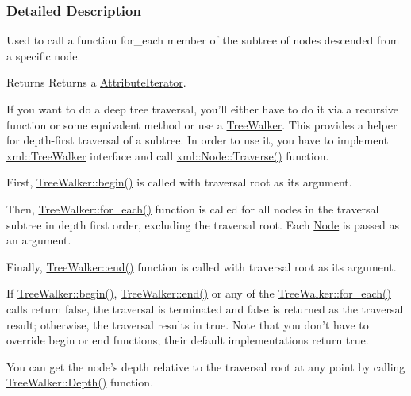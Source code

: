 \subsubsection{Detailed Description}
Used to call a function for\_\-each member of the subtree of nodes descended from a specific node. \begin{DoxyReturn}{Returns}
Returns a \hyperlink{classphys_1_1xml_1_1AttributeIterator}{AttributeIterator}.
\end{DoxyReturn}
If you want to do a deep tree traversal, you'll either have to do it via a recursive function or some equivalent method or use a \hyperlink{classphys_1_1xml_1_1TreeWalker}{TreeWalker}. This provides a helper for depth-\/first traversal of a subtree. In order to use it, you have to implement \hyperlink{classphys_1_1xml_1_1TreeWalker}{xml::TreeWalker} interface and call \hyperlink{classphys_1_1xml_1_1Node_a0029d08d3689c36d882ada0c0c9cf6e9}{xml::Node::Traverse()} function. \par
\par
 First, \hyperlink{classphys_1_1xml_1_1TreeWalker_a649d9e5a06542be0282d3d20994a62fc}{TreeWalker::begin()} is called with traversal root as its argument.\par
 Then, \hyperlink{classphys_1_1xml_1_1TreeWalker_a03267e73acac44809f16739fd00a536d}{TreeWalker::for\_\-each()} function is called for all nodes in the traversal subtree in depth first order, excluding the traversal root. Each \hyperlink{classphys_1_1xml_1_1Node}{Node} is passed as an argument.\par
 Finally, \hyperlink{classphys_1_1xml_1_1TreeWalker_a210f6d60579a152f89e651be797885b9}{TreeWalker::end()} function is called with traversal root as its argument.\par
\par
 If \hyperlink{classphys_1_1xml_1_1TreeWalker_a649d9e5a06542be0282d3d20994a62fc}{TreeWalker::begin()}, \hyperlink{classphys_1_1xml_1_1TreeWalker_a210f6d60579a152f89e651be797885b9}{TreeWalker::end()} or any of the \hyperlink{classphys_1_1xml_1_1TreeWalker_a03267e73acac44809f16739fd00a536d}{TreeWalker::for\_\-each()} calls return false, the traversal is terminated and false is returned as the traversal result; otherwise, the traversal results in true. Note that you don't have to override begin or end functions; their default implementations return true.\par
\par
 You can get the node's depth relative to the traversal root at any point by calling \hyperlink{classphys_1_1xml_1_1TreeWalker_a90fdd705ae4d5e8e3b931bb8896e4397}{TreeWalker::Depth()} function. 

